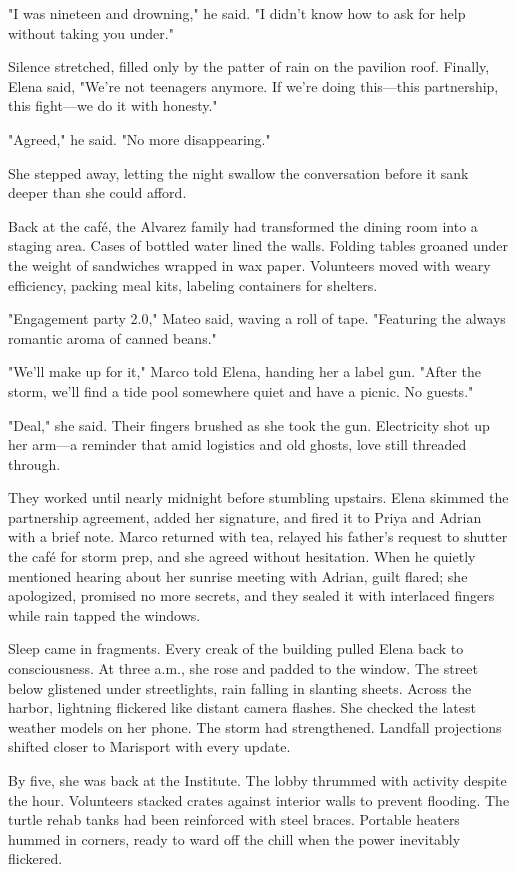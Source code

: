 "I was nineteen and drowning," he said. "I didn't know how to ask for help without taking you under."

Silence stretched, filled only by the patter of rain on the pavilion roof. Finally, Elena said, "We're not teenagers anymore. If we're doing this—this partnership, this fight—we do it with honesty."

"Agreed," he said. "No more disappearing."

She stepped away, letting the night swallow the conversation before it sank deeper than she could afford.

Back at the café, the Alvarez family had transformed the dining room into a staging area. Cases of bottled water lined the walls. Folding tables groaned under the weight of sandwiches wrapped in wax paper. Volunteers moved with weary efficiency, packing meal kits, labeling containers for shelters.

"Engagement party 2.0," Mateo said, waving a roll of tape. "Featuring the always romantic aroma of canned beans."

"We'll make up for it," Marco told Elena, handing her a label gun. "After the storm, we'll find a tide pool somewhere quiet and have a picnic. No guests."

"Deal," she said. Their fingers brushed as she took the gun. Electricity shot up her arm—a reminder that amid logistics and old ghosts, love still threaded through.

They worked until nearly midnight before stumbling upstairs. Elena skimmed the partnership agreement, added her signature, and fired it to Priya and Adrian with a brief note. Marco returned with tea, relayed his father's request to shutter the café for storm prep, and she agreed without hesitation. When he quietly mentioned hearing about her sunrise meeting with Adrian, guilt flared; she apologized, promised no more secrets, and they sealed it with interlaced fingers while rain tapped the windows.

Sleep came in fragments. Every creak of the building pulled Elena back to consciousness. At three a.m., she rose and padded to the window. The street below glistened under streetlights, rain falling in slanting sheets. Across the harbor, lightning flickered like distant camera flashes. She checked the latest weather models on her phone. The storm had strengthened. Landfall projections shifted closer to Marisport with every update.

By five, she was back at the Institute. The lobby thrummed with activity despite the hour. Volunteers stacked crates against interior walls to prevent flooding. The turtle rehab tanks had been reinforced with steel braces. Portable heaters hummed in corners, ready to ward off the chill when the power inevitably flickered.

